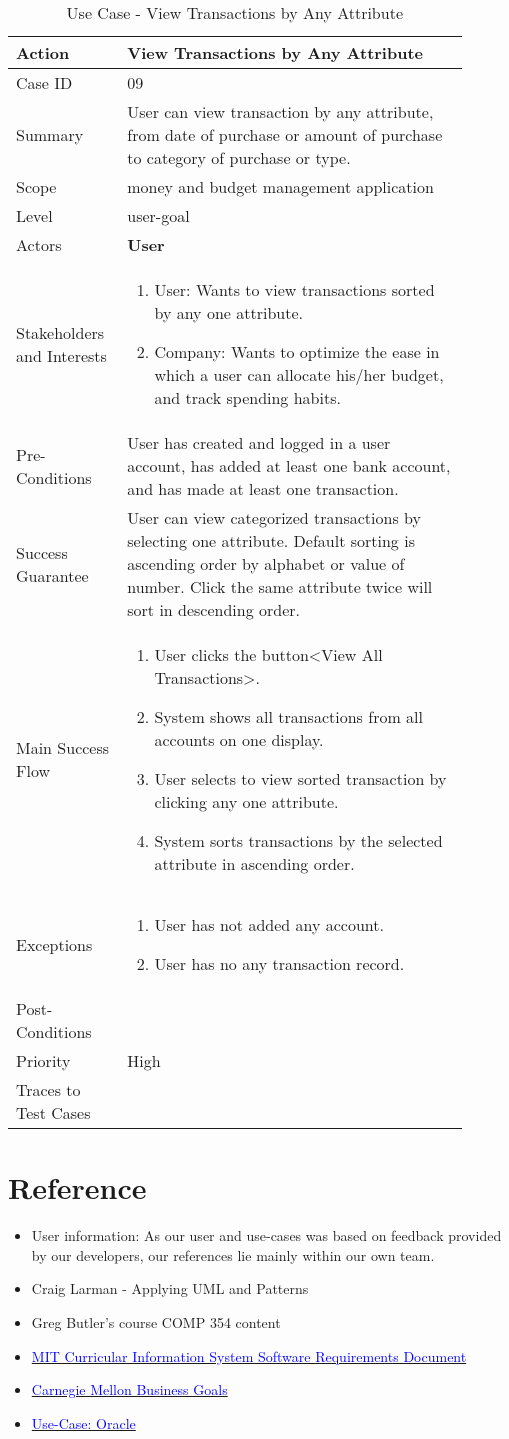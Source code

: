 \documentclass[11pt]{article}
\newcounter{use case ID}
\newcommand\tabularhead[1]{
\begin{table}[ht]
    \addtocounter{use case ID}{1}
    \caption{Use Case \arabic{use case ID} - #1}
    \vspace{0.2cm}
    \begin{tabular}{|p{0.2\linewidth}|p{0.70\linewidth}|}
    \hline
        \textbf{Action} & \textbf{#1} \\
        \hline}
\newcommand\addrow[2]{#1 & #2\\ \hline}
\newcommand\addmulrow[2]{ \begin{minipage}[t][][t]{2.5cm}#1\end{minipage}
        &\begin{minipage}[t][][t]{11cm}
        \begin{enumerate}[itemsep=-1ex] #2   \end{enumerate}
    \end{minipage}\vfill\\ \hline}
\newenvironment{usecase}{\tabularhead}
{\hline\end{tabular}\end{table}}
\begin{document}
\begin{usecase}{View Transactions by Any Attribute}
    \addrow{Case ID}{09}
    \addrow{Summary}{User can view transaction by any attribute, from date of purchase or amount of purchase to category of purchase or type.}
    \addrow{Scope}{money and budget management application}
    \addrow{Level}{user-goal}
    \addrow{Actors}{\textbf{User}}
    \addmulrow{Stakeholders and Interests}{
        \item User: Wants to view transactions sorted by any one attribute.
        \item Company: Wants to optimize the ease in which a user can allocate his/her budget, and track spending habits.}
    \addrow{Pre-Conditions}{User has created and logged in a user account, has added at least one bank account, and has made at least one transaction.}
    \addrow{Success Guarantee}{User can view categorized transactions by selecting one attribute. Default sorting is ascending order by alphabet or value of number. Click the same attribute twice will sort in descending order.}
    \addmulrow{Main Success Flow}{
        \item User clicks the button<View All Transactions>.
        \item System shows all transactions from all accounts on one display.
        \item User selects to view sorted transaction by clicking any one attribute.
        \item System sorts transactions by the selected attribute in ascending order.}
    \addmulrow{Exceptions}{
	\item User has not added any account.
	\item User has no any transaction record.}
    \addrow{Post-Conditions}{}
    \addrow{Priority}{High}
    \addrow{Traces to Test Cases}{}
\end{usecase}

\clearpage 
\section{Reference}

\begin{itemize}
\item User information: As our user and use-cases was based on feedback provided by our developers, our references lie mainly within our own team.
\item Craig Larman - Applying UML and Patterns
\item Greg Butler's course COMP 354 content
\item \href{http://web.mit.edu/ssit/cis/CISRequirements.html}{\textcolor{blue}{MIT Curricular Information System
Software Requirements Document}}
\item \href{https://resources.sei.cmu.edu/asset_files/TechnicalReport/2005_005_001_14621.pdf}{\textcolor{blue}{Carnegie Mellon Business Goals}}
\item \href{http://www.oracle.com/technetwork/testcontent/gettingstartedwithusecasemodeling-133857.pdf}{\textcolor{blue}{Use-Case: Oracle }}

\end{itemize}
\end{document}
